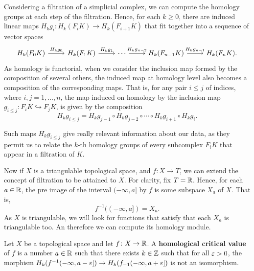 Considering a filtration of a simplicial complex, we can compute the homology groups at each step of the filtration. Hence, for each $ k \geq 0 $, there are induced linear maps $ H_kg_i \colon H_k(F_iK) \to H_k(F_{i+1}K) $ that fit together into a sequence of vector spaces
\begin{equation}
\begin{tikzcd}
    H_k(F_0K) \arrow[r, "H_kg_0"] & H_k(F_1K) \arrow[r, "H_kg_1"] & \cdots \arrow[r, "H_kg_{n-2}"] & H_k(F_{n-1}K) \arrow[r, "H_kg_{n-1}"] & H_k(F_nK).
\end{tikzcd}
\end{equation}
As homology is functorial, when we consider the inclusion map formed by the composition of several others, the induced map at homology level also becomes a composition of the corresponding maps. That is, for any pair $ i \leq j $ of indices, where $ i, j = 1, \dots, n $, the map induced on homology by the inclusion map $ g_{i \leq j} \colon F_i K \hookrightarrow F_j K $, is given by the composition
\begin{equation}
    H_k g_{i \leq j} = H_k g_{j-1} \circ H_k g_{j-2} \circ \cdots \circ H_k g_{i+1} \circ H_k g_i.
\end{equation}

Such maps $ H_k g_{i \leq j} $ give really relevant information about our data, as they permit us to relate the $k$-th homology groups of every subcomplex $ F_i K $ that appear in a filtration of $ K $.

Now if $ X $ is a triangulable topological space, and $ f \colon X \to T $, we can extend the concept of filtration to be attained to $ X $. For clarity, fix $ T = \mathbb R $. Hence, for each $ a \in \mathbb R $, the pre image of the interval $(-\infty, a] $ by $ f $ is some subspace $ X_a $ of $ X $. That is,
\begin{equation}
    f^{-1}((-\infty, a]) = X_a.
\end{equation}
As $ X $ is triangulable, we will look for functions that satisfy that each $ X_a $ is triangulable too. An therefore we can compute its homology module.

\begin{definition} \label{def:critical-value}
    Let $ X $ be a topological space and let $ f\colon X \to \mathbb R $. A {\bf homological critical value} of $ f $ is a number $ a \in \mathbb R $ such that there exists $k \in \mathbb Z$ such that for all 
    $ \varepsilon > 0 $, the morphism $ H_k(f^{-1}(-\infty, a - \varepsilon]) \to H_k(f_{-1}(-\infty, a + \varepsilon]) $ is not an isomorphism.
\end{definition}

